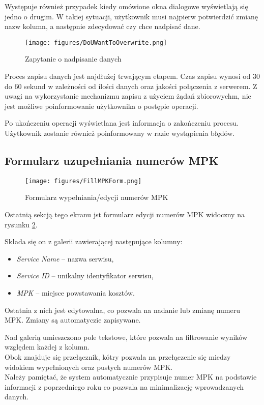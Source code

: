 Występuje również przypadek kiedy omówione okna dialogowe wyświetlają się jedno o drugim. W takiej sytuacji, użytkownik musi najpierw potwierdzić zmianę nazw kolumn, a następnie zdecydować czy chce nadpisać dane.

\begin{figure}[h]
            \centering
            \texttt{[image: figures/DoUWantToOverwrite.png]}
            \caption{Zapytanie o nadpisanie danych}
            \label{fig:DoYouWantToOverwrite}
        \end{figure}

Proces zapisu danych jest najdłużej trwającym etapem. Czas zapisu wynosi od 30 do 60 sekund w zależności od ilości danych oraz jakości połączenia z serwerem. Z uwagi na wykorzystanie mechanizmu zapisu z użyciem żądań zbiorowychm, nie jest możliwe poinformowanie użytkownika o postępie operacji.

Po ukończeniu operacji wyświetlana jest informacja o zakończeniu procesu. Użytkownik zostanie również poinformowany w razie wystąpienia błędów.

\subsection{Formularz uzupełniania numerów MPK}
 \begin{figure}[h]
     \centering
     \texttt{[image: figures/FillMPKForm.png]}
     \caption{Formularz wypełniania/edycji numerów MPK}
     \label{fig:fillmpkform}
 \end{figure}

 Ostatnią sekcją tego ekranu jst formularz edycji numerów MPK widoczny na rysunku \ref{fig:fillmpkform}. 

 Składa się on z galerii zawierającej następujące kolumny:
 \begin{itemize}
    \item \emph{Service Name} -- nazwa serwisu,
    \item \emph{Service ID} -- unikalny identyfikator serwisu,
    \item \emph{MPK} -- miejsce powstawania kosztów.
 \end{itemize}
 Ostatnia z nich jest edytowalna, co pozwala na nadanie lub zmianę numeru MPK. Zmiany są automatyczie zapisywane.

 Nad galerią umieszczono pole tekstowe, które pozwala na filtrowanie wyników względem każdej z kolumn. \\Obok znajduje się przełącznik, kótry pozwala na przełączenie się miedzy widokiem wypełnionych oraz pustych numerów MPK.\\
 Należy pamiętać, że system automatycznie przypisuje numer MPK na podstawie informacji z poprzedniego roku co pozwala na minimalizację wprowadzanych danych.

